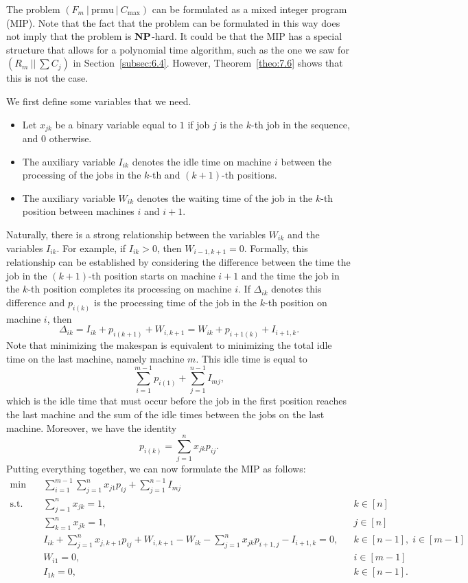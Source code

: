 The problem $(F_m~|~\text{prmu}~|~C_{\max})$ can be formulated 
as a mixed integer program (MIP). Note that the fact that the problem 
can be formulated in this way does not imply that the problem is 
$\operatorname{\textbf{NP}}$-hard. It could be that the MIP has a special structure that 
allows for a polynomial time algorithm, such as the one we saw 
for $(R_m~||~\sum C_j)$ in Section~\ref{subsec:6.4}. However, 
Theorem~\ref{theo:7.6} shows that this is not the case. 

We first define some variables that we need.
\begin{itemize}
    \item Let $x_{jk}$ be a binary variable equal to $1$ if job $j$ is the 
    $k$-th job in the sequence, and $0$ otherwise. 
    \item The auxiliary variable $I_{ik}$ denotes the idle time on machine $i$
    between the processing of the jobs in the $k$-th and $(k+1)$-th positions. 
    \item The auxiliary variable $W_{ik}$ denotes the waiting time of the 
    job in the $k$-th position between machines $i$ and $i+1$. 
\end{itemize} 
Naturally, there is a strong relationship between the variables $W_{ik}$ and 
the variables $I_{ik}$. For example, if $I_{ik} > 0$, then 
$W_{i-1,k+1} = 0$. Formally, this relationship can be established by 
considering the difference between the time the job in the $(k+1)$-th 
position starts on machine $i+1$ and the time the job in the $k$-th position 
completes its processing on machine $i$. If $\Delta_{ik}$ denotes this 
difference and $p_{i(k)}$ is the processing time of the job in the 
$k$-th position on machine $i$, then 
\[ \Delta_{ik} = I_{ik} + p_{i(k+1)} + W_{i,k+1} = W_{ik} + p_{i+1(k)} 
+ I_{i+1,k}. \] 
Note that minimizing the makespan is equivalent to minimizing the 
total idle time on the last machine, namely machine $m$. This idle 
time is equal to 
\[ \sum_{i=1}^{m-1} p_{i(1)} + \sum_{j=1}^{n-1} I_{mj}, \] 
which is the idle time that must occur before the job in the first position 
reaches the last machine and the sum of the idle times between the jobs 
on the last machine. Moreover, we have the identity
\[ p_{i(k)} = \sum_{j=1}^n x_{jk} p_{ij}. \] 
Putting everything together, we can now formulate the MIP as follows: 
\begin{align*}
    \min\quad & \sum_{i=1}^{m-1} \sum_{j=1}^n x_{j1} p_{ij} + \sum_{j=1}^{n-1} I_{mj} \\ 
    \text{s.t.}\quad & \sum_{j=1}^n x_{jk} = 1, && k \in [n] \\ 
    & \sum_{k=1}^n x_{jk} = 1, && j \in [n] \\ 
    & I_{ik} + \sum_{j=1}^n x_{j,k+1} p_{ij} + W_{i,k+1} - W_{ik} 
    - \sum_{j=1}^n x_{jk} p_{i+1,j} - I_{i+1,k} = 0, && k \in [n-1],\; i \in [m-1] \\
    & W_{i1} = 0, && i \in [m-1] \\
    & I_{1k} = 0, && k \in [n-1].
\end{align*}
